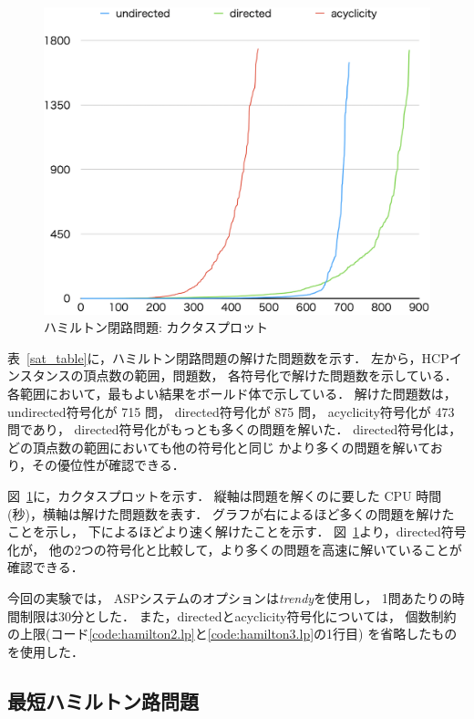 \begin{figure}[tb]
\begin{center}
  \includegraphics[width=0.8\linewidth]{fig/cactus_fhcp.png}
\caption{ハミルトン閉路問題: カクタスプロット}
\label{cactus}
\end{center}
\end{figure}

表~\ref{sat_table}に，ハミルトン閉路問題の解けた問題数を示す．
左から，HCPインスタンスの頂点数の範囲，問題数，
各符号化で解けた問題数を示している．
各範囲において，最もよい結果をボールド体で示している．
% 
解けた問題数は，
\textsf{undirected}符号化が 715 問，
\textsf{directed}符号化が 875 問，
\textsf{acyclicity}符号化が 473 問であり，
\textsf{directed}符号化がもっとも多くの問題を解いた．
\textsf{directed}符号化は，どの頂点数の範囲においても他の符号化と同じ
かより多くの問題を解いており，その優位性が確認できる．

図~\ref{cactus}に，カクタスプロットを示す．
縦軸は問題を解くのに要した CPU 時間(秒)，横軸は解けた問題数を表す．
グラフが右によるほど多くの問題を解けたことを示し，
下によるほどより速く解けたことを示す．
図~\ref{cactus}より，\textsf{directed}符号化が，
他の2つの符号化と比較して，より多くの問題を高速に解いていることが確認できる．

今回の実験では，
ASPシステム{\clingo}のオプションは\textit{trendy}を使用し，
1問あたりの時間制限は30分とした．
また，\textsf{directed}と\textsf{acyclicity}符号化については，
個数制約の上限(コード\ref{code:hamilton2.lp}と\ref{code:hamilton3.lp}の1行目)
を省略したものを使用した．

\subsection{最短ハミルトン路問題}

